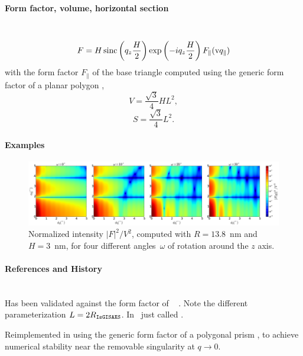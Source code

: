 \paragraph{Form factor, volume, horizontal section}\strut\\
\begin{equation*}
F = H \operatorname{sinc}\left(q_z\frac{H}{2}\right) \exp\left(-i q_z\frac{ H}{2}\right) F_\parallel(\text{v}{q}_\parallel)
\end{equation*}
with the form factor $F_\parallel$ of the base triangle
computed using the generic form factor of a planar polygon \cite{ba:ffp},
\begin{equation*}
  V= \dfrac{\sqrt{3}}{4} H L^2,
\end{equation*}
\begin{equation*}
  S =\dfrac{\sqrt{3}}{4}L^2.
\end{equation*}

\paragraph{Examples}\strut

\begin{figure}[H]
\begin{center}
\includegraphics[width=\textwidth]{fig/ff2/ff_Prism3.pdf}
\end{center}
\caption{Normalized intensity $|F|^2/V^2$,
computed with $R=13.8$~nm and $H=3$~nm,
for four different angles~$\omega$ of rotation around the $z$ axis.}
\label{fig:FFprism3Ex}
\end{figure}

\paragraph{References and History}\strut\\
Has been validated against the  form factor of \IsGISAXS\
\cite[Eq.~2.29]{Laz08} \cite[Eq.~219]{ReLL09}.
Note the different parameterization $L= 2 R_{\rm{\texttt{IsGISAXS}}}$.
In \FitGISAXS\ just called \E{Prism} \cite{Bab13}.

Reimplemented in  using the generic form factor
of a polygonal prism \cite{ba:ffp},
to achieve numerical stability near the removable singularity at $q\to0$.


